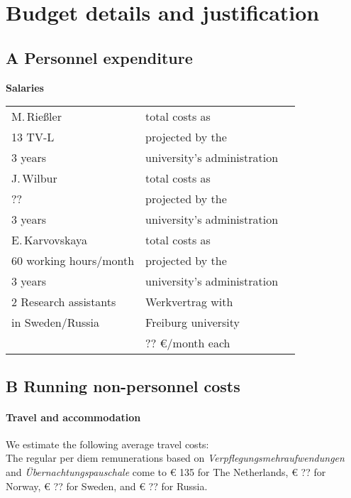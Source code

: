 \documentclass[a4paper,12pt]{article}
\begin{document}
\section{Budget details and justification}
\subsection*{A Personnel expenditure}
\noindent \textbf{Salaries}\\
\begin{longtable}{| l | l | r |}
\hline
M.\,Rießler&total costs as&\\
13 TV-L&projected by the&\\
3 years&university's administration&\\
\hline
J.\,Wilbur&total costs as&\\
??&projected by the&\\
3 years&university's administration&\\
\hline
E.\,Karvovskaya&total costs as&\\
60 working hours/month& projected by the&\\
3 years&university's administration&\\
\hline
2 Research assistants&Werkvertrag with&\\
in Sweden/Russia&Freiburg university&\\
&?? €/month each&\\
\hline
\end{longtable}

\subsection*{B Running non-personnel costs}
\paragraph{Travel and accommodation}
We estimate the following average travel costs:\\

\noindent The regular per diem remunerations based on \textit{Verpflegungsmehraufwendungen} and \textit{Übernachtungspauschale} come to € 135 for The Netherlands, € ?? for Norway, € ?? for Sweden, and € ?? for Russia.
\end{document}
